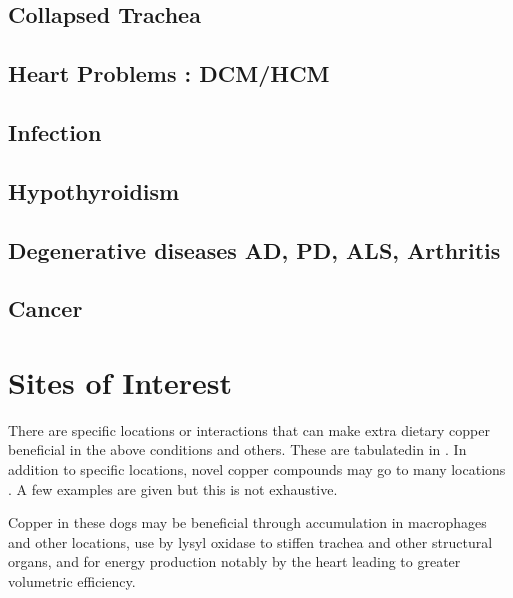  \mjmdistab

\subsection{ Collapsed Trachea }

\mjmcollapse

\subsection{ Heart Problems : DCM/HCM}

\mjmdcm

\subsection{ Infection }

\mjminfect

\subsection{ Hypothyroidism  }

\mjmthy

\subsection{ Degenerative diseases AD, PD, ALS, Arthritis  }

\mjmmisc

\subsection{ Cancer }

\mjmcancer

\section{ Sites of Interest }

There are specific locations or interactions
that can make extra dietary copper beneficial
in the above conditions and others.
These are  tabulatedin in .
In addition to specific locations, novel
copper compounds may go to many locations
. A  few examples are given  but this is not
exhaustive. 


Copper in these dogs may be beneficial through accumulation
in macrophages and other locations, use by lysyl oxidase to
stiffen trachea and other structural organs, and for
energy production notably by the heart leading to greater
volumetric efficiency. 

